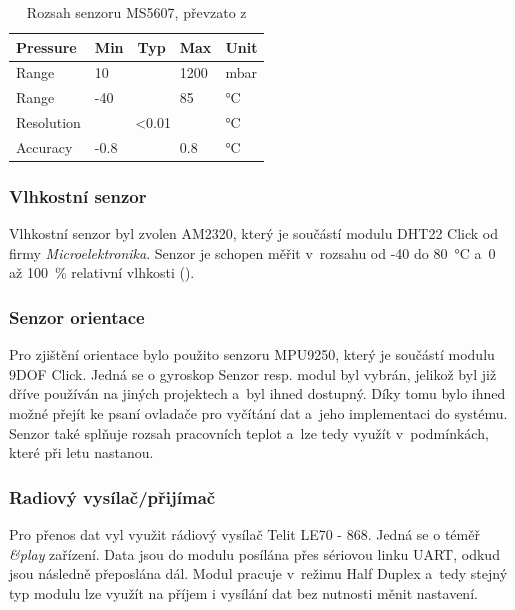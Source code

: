 \documentclass[twoside]{ctuthesis}
\theoremstyle{plain}
\theoremstyle{definition}
\theoremstyle{note}
\begin{document}
			\begin{table}[]
				\begin{tabular}{|l|lll|l|}
				\hline
				Pressure   & \multicolumn{1}{l|}{Min}  & \multicolumn{1}{l|}{Typ} & Max  & Unit \\ \hline
				Range      & \multicolumn{1}{l|}{10}   & \multicolumn{1}{l|}{}    & 1200 & mbar \\ \hline
				Range      & \multicolumn{1}{l|}{-40}  & \multicolumn{1}{l|}{}    & 85   & °C   \\ \hline
				Resolution & \multicolumn{3}{c|}{\textless{}0.01}                        & °C   \\ \hline
				Accuracy   & \multicolumn{1}{l|}{-0.8} & \multicolumn{1}{l|}{}    & 0.8  & °C   \\ \hline
				\end{tabular}
				\caption{Rozsah senzoru MS5607, převzato z \cite{dsh_MS5607}}
				\label{tab:ms:range}
			\end{table}

			


			
			\subsubsection{Vlhkostní senzor}
			Vlhkostní senzor byl zvolen AM2320, který je součástí modulu DHT22 Click od firmy \textit{Microelektronika}. Senzor je schopen měřit v~rozsahu od -40 do 80~°C a~0 až 100~\% relativní vlhkosti (). 



			
			\subsubsection{Senzor orientace}
			Pro zjištění orientace bylo použito senzoru MPU9250, který je součástí modulu 9DOF Click. Jedná se o gyroskop Senzor resp. modul byl vybrán, jelikož byl již dříve používán na jiných projektech a~byl ihned dostupný. Díky tomu bylo ihned možné přejít ke psaní ovladače pro vyčítání dat a~jeho implementaci do systému. Senzor také splňuje rozsah pracovních teplot \cite{dsh_mpu} a~lze tedy využít v~podmínkách, které při letu nastanou.  
			

			\subsubsection{Radiový vysílač/přijímač}
			\label{sec:telit}
			Pro přenos dat vyl využit rádiový vysílač Telit LE70 - 868. Jedná se o téměř \textit{\&play} zařízení. Data jsou do modulu posílána přes sériovou linku UART, odkud jsou následně přeposlána dál. Modul pracuje v~režimu Half Duplex a~tedy stejný typ modulu lze využít na příjem i vysílání dat bez nutnosti měnit nastavení. 
\end{document}
